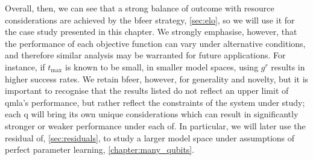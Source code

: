 Overall, then, we can see that a strong balance of outcome with resource considerations 
    are achieved by the \gls{bfeer} strategy, \cref{sec:elo},
    so we will use it for the case study presented in this chapter. 
We strongly emphasise, however, that the performance of each objective function
    can vary under alternative conditions, and therefore similar analysis may 
    be warranted for future applications. 
For instance, if $t_{\textrm{max}}$ is known to be small, 
    in smaller model spaces, using $g^r$ results in higher success rates.
We retain \gls{bfeer}, however, for generality and novelty, 
    but it is important to recognise that the results listed do not reflect
    an upper limit of \gls{qmla}'s performance, 
    but rather reflect the constraints of the system under study; 
    each \gls{q} will bring its own unique considerations which can result in 
    significantly stronger or weaker performance under each \gls{of}. 
In particular, we will later use the residual \gls{of}, \cref{sec:residuals}, 
    to study a larger \gls{model space} under assumptions of perfect parameter learning, \cref{chapter:many_qubits}.



